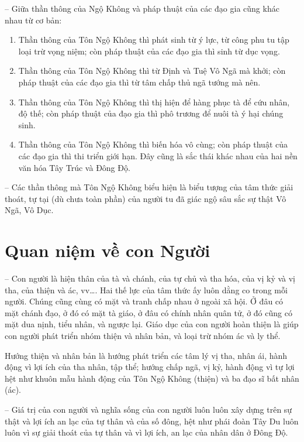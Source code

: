 -- Giữa thần thông của Ngộ Không và pháp thuật của các đạo gia cũng khác nhau từ cơ bản:

\begin{enumerate}[label=\itshape\alph*\upshape/]
    \item Thần thông của Tôn Ngộ Không thì phát sinh từ ý lực, từ công phu tu tập loại trừ vọng niệm; còn pháp thuật của các đạo gia thì sinh từ dục vọng.

    \item Thần thông của Tôn Ngộ Không thì từ Định và Tuệ Vô Ngã mà khởi; còn pháp thuật của các đạo gia thì từ tâm chấp thủ ngã tướng mà nên.

    \item Thần thông của Tôn Ngộ Không thì thị hiện để hàng phục tà để cứu nhân, độ thế; còn pháp thuật của đạo gia thì phô trương để nuôi tà ý hại chúng sinh.

    \item Thần thông của Tôn Ngộ Không thì biến hóa vô cùng; còn pháp thuật của các đạo gia thì thi triển giới hạn. Đây cũng là sắc thái khác nhau của hai nền văn hóa Tây Trúc và Đông Độ.
\end{enumerate}

-- Các thần thông mà Tôn Ngộ Không biểu hiện là biểu tượng của tâm thức giải thoát, tự tại (dù chưa toàn phần) của người tu đã giác ngộ sâu sắc sự thật Vô Ngã, Vô Dục.


\section{Quan niệm về con Người} %
\label{sec:44_45_con_nguoi}

-- Con người là hiện thân của tà và chánh, của tự chủ và tha hóa, của vị kỷ và vị tha, của thiện và ác, vv\ldots. Hai thế lực của tâm thức ấy luôn dằng co trong mỗi người. Chúng cũng cùng có mặt và tranh chấp nhau ở ngoài xã hội. Ở đâu có mặt chánh đạo, ở đó có mặt tà giáo, ở đâu có chính nhân quân tử, ở đó cũng có mặt dua nịnh, tiểu nhân, và ngược lại. Giáo dục của con người hoàn thiện là giúp con người phát triển nhóm thiện và nhân bản, và loại trừ nhóm ác và ly thể.

Hướng thiện và nhân bản là hướng phát triển các tâm lý vị tha, nhân ái, hành động vì lợi ích của tha nhân, tập thể; hướng chấp ngã, vị kỷ, hành động vì tự lợi hệt như khuôn mẫu hành động của Tôn Ngộ Không (thiện) và ba đạo sĩ bất nhân (ác).

-- Giá trị của con người và nghĩa sống của con người luôn luôn xây dựng trên sự thật và lợi ích an lạc của tự thân và của số đông, hệt như phái đoàn Tây Du luôn luôn vì sự giải thoát của tự thân và vì lợi ích, an lạc của nhân dân ở Đông Độ.

